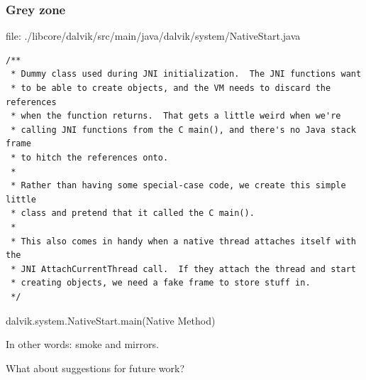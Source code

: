 \documentclass[11pt,a4paper]{beamer}
\begin{document}
\begin{frame}[fragile]
\frametitle{Grey zone}

file: ./libcore/dalvik/src/main/java/dalvik/system/NativeStart.java
\scriptsize
\begin{verbatim}
/**
 * Dummy class used during JNI initialization.  The JNI functions want
 * to be able to create objects, and the VM needs to discard the references
 * when the function returns.  That gets a little weird when we're
 * calling JNI functions from the C main(), and there's no Java stack frame
 * to hitch the references onto.
 *
 * Rather than having some special-case code, we create this simple little
 * class and pretend that it called the C main().
 *
 * This also comes in handy when a native thread attaches itself with the
 * JNI AttachCurrentThread call.  If they attach the thread and start
 * creating objects, we need a fake frame to store stuff in.
 */
\end{verbatim}
dalvik.system.NativeStart.main(Native Method)

In other words: smoke and mirrors.

\end{frame}

\begin{frame}[fragile]

What about suggestions for future work?

\end{frame}
\end{document}
